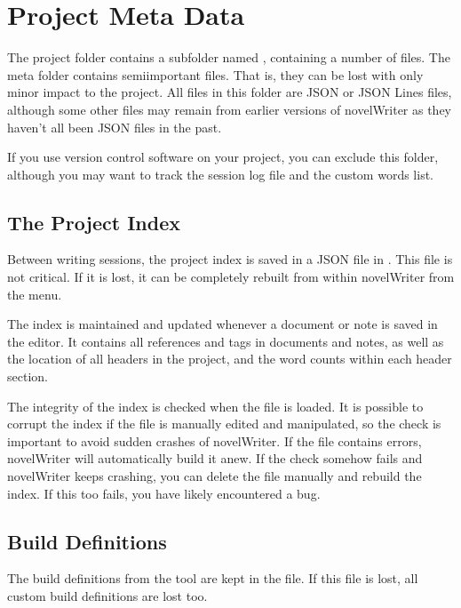 \documentclass[a4paper,11pt,english]{sphinxmanual}
\begin{document}
\section{Project Meta Data}
\label{\detokenize{tech_storage:project-meta-data}}
\sphinxAtStartPar
The project folder contains a subfolder named , containing a number of files. The meta
folder contains semi\sphinxhyphen{}important files. That is, they can be lost with only minor impact to the
project. All files in this folder are JSON or JSON Lines files, although some other files may
remain from earlier versions of novelWriter as they haven’t all been JSON files in the past.

\sphinxAtStartPar
If you use version control software on your project, you can exclude this folder, although you may
want to track the session log file and the custom words list.


\subsection{The Project Index}
\label{\detokenize{tech_storage:the-project-index}}
\sphinxAtStartPar
Between writing sessions, the project index is saved in a JSON file in .
This file is not critical. If it is lost, it can be completely rebuilt from within novelWriter from
the  menu.

\sphinxAtStartPar
The index is maintained and updated whenever a document or note is saved in the editor. It contains
all references and tags in documents and notes, as well as the location of all headers in the
project, and the word counts within each header section.

\sphinxAtStartPar
The integrity of the index is checked when the file is loaded. It is possible to corrupt the index
if the file is manually edited and manipulated, so the check is important to avoid sudden crashes
of novelWriter. If the file contains errors, novelWriter will automatically build it anew. If the
check somehow fails and novelWriter keeps crashing, you can delete the file manually and rebuild
the index. If this too fails, you have likely encountered a bug.


\subsection{Build Definitions}
\label{\detokenize{tech_storage:build-definitions}}
\sphinxAtStartPar
The build definitions from the  tool are kept in the  file.
If this file is lost, all custom build definitions are lost too.
\end{document}
